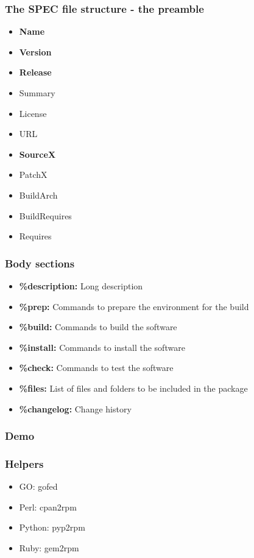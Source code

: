 \documentclass[t,aspectratio=169]{beamer}
\begin{document}
\begin{frame}
    \frametitle{The SPEC file structure - the preamble}
    \begin{itemize}
        \item<2-> \textbf{Name}
        \item<3-> \textbf{Version}
        \item<4-> \textbf{Release}
        \item<5-> Summary
        \item<6-> License
        \item<7-> URL
        \item<8-> \textbf{SourceX}
        \item<9-> PatchX
        \item<10-> BuildArch
        \item<11-> BuildRequires
        \item<12-> Requires
    \end{itemize}
\end{frame}

\begin{frame}
    \frametitle{Body sections}
    \begin{itemize}
        \item<2-> \textbf{\%description:} Long description
        \item<3-> \textbf{\%prep:} Commands to prepare the environment for the build
        \item<4-> \textbf{\%build:} Commands to build the software
        \item<5-> \textbf{\%install:} Commands to install the software
        \item<6-> \textbf{\%check:} Commands to test the software
        \item<7-> \textbf{\%files:} List of files and folders to be included in the package
        \item<8-> \textbf{\%changelog:} Change history
    \end{itemize}
\end{frame}

\begin{frame}
    \frametitle{Demo}
\end{frame}

\begin{frame}
    \frametitle{Helpers}
    \begin{itemize}
        \item GO: gofed
        \item Perl: cpan2rpm
        \item Python: pyp2rpm
        \item Ruby: gem2rpm
    \end{itemize}
\end{frame}
\end{document}

